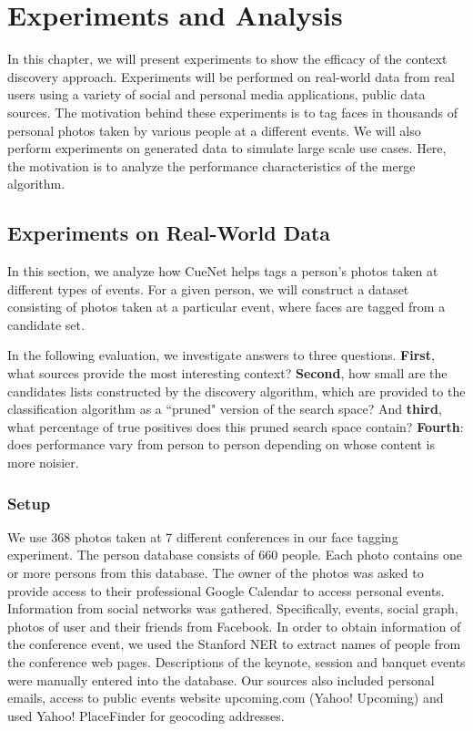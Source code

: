 \chapter{Experiments and Analysis}

In this chapter, we will present experiments to show the efficacy of the context discovery approach. Experiments will be performed on real-world data from real users using a variety of social and personal media applications, public data sources. The motivation behind these experiments is to tag faces in thousands of personal photos taken by various people at a different events. We will also perform experiments on generated data to simulate large scale use cases. Here, the motivation is to analyze the performance characteristics of the merge algorithm.

\section{Experiments on Real-World Data}
In this section, we analyze how CueNet helps tags a person's photos taken at different types of events. For a given person, we will construct a dataset consisting of photos taken at a particular event, where faces are tagged from a candidate set.

In the following evaluation, we investigate answers to three questions. \textbf{First}, what sources provide the most interesting context? \textbf{Second}, how small are the candidates lists constructed by the discovery algorithm, which are provided to the classification algorithm as a ``pruned" version of the search space? And \textbf{third}, what percentage of true positives does this pruned search space contain? \textbf{Fourth}: does performance vary from person to person depending on whose content is more noisier.

\subsection{Setup}
We use 368 photos taken at 7 different conferences in our face tagging experiment. The person database consists of 660 people. Each photo contains one or more persons from this database. The owner of the photos was asked to provide access to their professional Google Calendar to access personal events. Information from social networks was gathered. Specifically, events, social graph, photos of user and their friends from Facebook. In order to obtain information of the conference event, we used the Stanford NER\cite{finkel2005incorporating} to extract names of people from the conference web pages. Descriptions of the keynote, session and banquet events were manually entered into the database. Our sources also included personal emails, access to public events website upcoming.com (Yahoo! Upcoming) and used Yahoo! PlaceFinder for geocoding addresses.

